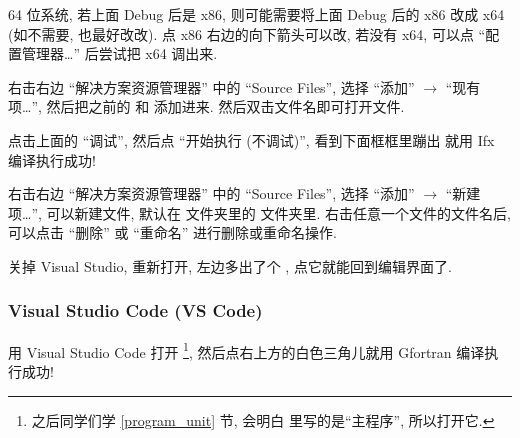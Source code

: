 64 位系统, 若上面 Debug 后是 x86, 则可能需要将上面 Debug 后的 x86 改成 x64 (如不需要, 也最好改改). 点 x86 右边的向下箭头可以改, 若没有 x64, 可以点 ``配置管理器\dots{}'' 后尝试把 x64 调出来.

右击右边 ``解决方案资源管理器'' 中的 ``Source Files'', 选择 ``添加'' $\rightarrow$ ``现有项\dots{}'', 然后把之前的  和  添加进来. 然后双击文件名即可打开文件.

点击上面的 ``调试'', 然后点 ``开始执行 (不调试)'', 看到下面框框里蹦出  就用 Ifx 编译执行成功!

右击右边 ``解决方案资源管理器'' 中的 ``Source Files'', 选择 ``添加'' $\rightarrow$ ``新建项\dots{}'', 可以新建文件, 默认在  文件夹里的  文件夹里. 右击任意一个文件的文件名后, 可以点击 ``删除'' 或 ``重命名'' 进行删除或重命名操作.

关掉 Visual Studio, 重新打开, 左边多出了个 , 点它就能回到编辑界面了.

\subsubsection{Visual Studio Code (VS Code)}

用 Visual Studio Code 打开 \footnote{之后同学们学 \ref{program_unit} 节, 会明白  里写的是``主程序'', 所以打开它.}, 然后点右上方的白色三角儿就用 Gfortran 编译执行成功!
